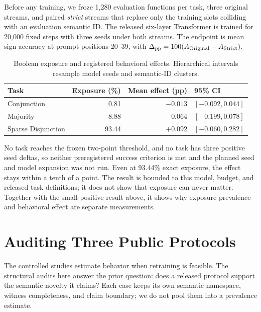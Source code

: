 \documentclass[twoside,11pt]{article}
\begin{document}
Before any training, we froze 1,280 evaluation functions per task, three
original streams, and paired \emph{strict} streams that replace only the
training slots colliding with an evaluation semantic ID.  The released
six-layer Transformer is trained for 20,000 fixed steps with three seeds
under both streams.  The endpoint is mean sign accuracy at prompt positions
20--39, with \(\Delta_{\rm pp}=100(A_{\rm Original}-A_{\rm Strict})\).

\begin{table}[t]
\caption{Boolean exposure and registered behavioral effects.  Hierarchical
intervals resample model seeds and semantic-ID clusters.}
\label{tab:boolean-main}
\centering
\small
\begin{tabular}{lrrl}
\toprule
Task & Exposure (\%) & Mean effect (pp) & 95\% CI \\
\midrule
Conjunction & 0.81 & $-0.013$ & $[-0.092,0.044]$ \\
Majority & 8.88 & $-0.064$ & $[-0.199,0.078]$ \\
Sparse Disjunction & 93.44 & $+0.092$ & $[-0.060,0.282]$ \\
\bottomrule
\end{tabular}
\end{table}

No task reaches the frozen two-point threshold, and no task has three
positive seed deltas, so neither preregistered success criterion is met and
the planned seed and model expansion was not run.  Even at 93.44\% exact
exposure, the effect stays within a tenth of a point.  The result is bounded
to this model, budget, and released task definitions; it does not show that
exposure can never matter.  Together with the small positive result above,
it shows why exposure prevalence and behavioral effect are separate
measurements.



\section{Auditing Three Public Protocols}
\label{sec:public-audits}

The controlled studies estimate behavior when retraining is feasible.  The
structural audits here answer the prior question: does a released protocol
support the semantic novelty it claims?  Each case keeps its own semantic
namespace, witness completeness, and claim boundary; we do not pool them
into a prevalence estimate.
\end{document}
